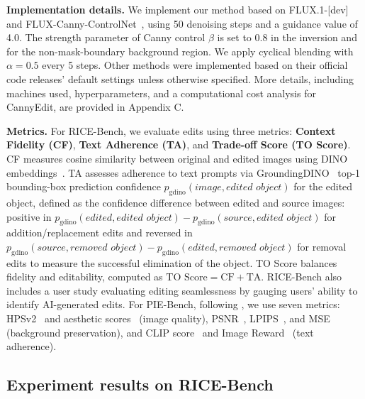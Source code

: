 \documentclass{article}
\begin{document}
\textbf{Implementation details.} We implement our method based on FLUX.1-[dev]~\cite{blackforest2024FLUX} and FLUX-Canny-ControlNet~\cite{xlabsai2025fluxcontrolnet}, using 50 denoising steps and a guidance value of 4.0. The strength parameter of Canny control $\beta$ is set to 0.8 in the inversion and for the non-mask-boundary background region. We apply cyclical blending with $\alpha=0.5$ every 5 steps. Other methods were implemented based on their official code releases' default settings unless otherwise specified. More details, including machines used, hyperparameters, and a computational cost analysis for CannyEdit, are provided in {Appendix C}.


\textbf{Metrics.}  For RICE-Bench, we evaluate edits using three metrics: \textbf{Context Fidelity (CF)}, \textbf{Text Adherence (TA)}, and \textbf{Trade-off Score (TO Score)}. CF measures cosine similarity between original and edited images using DINO embeddings~\citep{caron2021emerging}. TA assesses adherence to text prompts via GroundingDINO~\citep{liu2024grounding} top-1 bounding-box prediction confidence $p_{\text{gdino}}(\textit{image}, \textit{edited object})$ for the edited object, defined as the confidence difference between edited and source images: positive in $p_{\text{gdino}}(\textit{edited}, \textit{edited object})-p_{\text{gdino}}(\textit{source}, \textit{edited object})$ for addition/replacement edits and reversed in $p_{\text{gdino}}(\textit{source}, \textit{removed object})-p_{\text{gdino}}(\textit{edited}, \textit{removed object})$ for removal edits to measure the successful elimination of the object. TO Score balances fidelity and editability, computed as $\text{TO Score} = \text{CF} + \text{TA}$. RICE-Bench also includes a user study evaluating editing seamlessness by gauging users' ability to identify AI-generated edits. For PIE-Bench, following \citet{zhu2025kv}, we use seven metrics: HPSv2~\citep{wu2023human} and aesthetic scores~\citep{schuhmann2022laionb} (image quality), PSNR~\citep{huynh2008scope}, LPIPS~\citep{zhang2018perceptual}, and MSE (background preservation), and CLIP score~\citep{radford2021learning} and Image Reward~\citep{xu2023imagereward} (text adherence).




\vspace{-2mm}
\subsection{Experiment results on RICE-Bench}
\end{document}
